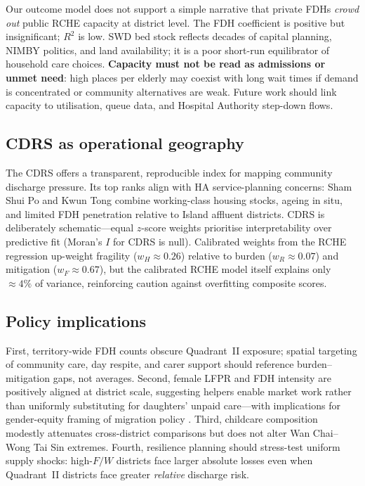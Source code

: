 \documentclass[11pt,a4paper]{article}
\begin{document}
Our outcome model does not support a simple narrative that private FDHs \emph{crowd out} public RCHE capacity at district level. The FDH coefficient is positive but insignificant; $R^2$ is low. SWD bed stock reflects decades of capital planning, NIMBY politics, and land availability; it is a poor short-run equilibrator of household care choices. \textbf{Capacity must not be read as admissions or unmet need}: high places per elderly may coexist with long wait times if demand is concentrated or community alternatives are weak. Future work should link capacity to utilisation, queue data, and Hospital Authority step-down flows.

\subsection{CDRS as operational geography}

The CDRS offers a transparent, reproducible index for mapping community discharge pressure. Its top ranks align with HA service-planning concerns: Sham Shui Po and Kwun Tong combine working-class housing stocks, ageing in situ, and limited FDH penetration relative to Island affluent districts. CDRS is deliberately schematic---equal $z$-score weights prioritise interpretability over predictive fit (Moran's $I$ for CDRS is null). Calibrated weights from the RCHE regression up-weight fragility ($w_H{\approx}0.26$) relative to burden ($w_R{\approx}0.07$) and mitigation ($w_F{\approx}0.67$), but the calibrated RCHE model itself explains only ${\approx}4\%$ of variance, reinforcing caution against overfitting composite scores.

\subsection{Policy implications}

First, territory-wide FDH counts obscure Quadrant~II exposure; spatial targeting of community care, day respite, and carer support should reference burden--mitigation gaps, not averages. Second, female LFPR and FDH intensity are positively aligned at district scale, suggesting helpers enable market work rather than uniformly substituting for daughters' unpaid care---with implications for gender-equity framing of migration policy \citep{yeates2009}. Third, childcare composition modestly attenuates cross-district comparisons but does not alter Wan Chai--Wong Tai Sin extremes. Fourth, resilience planning should stress-test uniform supply shocks: high-$F/W$ districts face larger absolute losses even when Quadrant~II districts face greater \emph{relative} discharge risk.
\end{document}
